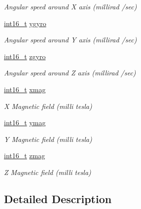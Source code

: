 \begin{DoxyCompactItemize}
\begin{DoxyCompactList}\small\item\em Angular speed around X axis (millirad /sec) \end{DoxyCompactList}\item 
\hyperlink{stdint_8h_aa343fa3b3d06292b959ffdd4c4703b06}{int16\-\_\-t} \hyperlink{struct____mavlink__scaled__imu__t_a357d16590de8334390c67ddd5d3139b3}{ygyro}
\begin{DoxyCompactList}\small\item\em Angular speed around Y axis (millirad /sec) \end{DoxyCompactList}\item 
\hyperlink{stdint_8h_aa343fa3b3d06292b959ffdd4c4703b06}{int16\-\_\-t} \hyperlink{struct____mavlink__scaled__imu__t_a907db6388e441e51dc12ca89fa6c557b}{zgyro}
\begin{DoxyCompactList}\small\item\em Angular speed around Z axis (millirad /sec) \end{DoxyCompactList}\item 
\hyperlink{stdint_8h_aa343fa3b3d06292b959ffdd4c4703b06}{int16\-\_\-t} \hyperlink{struct____mavlink__scaled__imu__t_a600200625259b8ddc5702b2116e9d619}{xmag}
\begin{DoxyCompactList}\small\item\em X Magnetic field (milli tesla) \end{DoxyCompactList}\item 
\hyperlink{stdint_8h_aa343fa3b3d06292b959ffdd4c4703b06}{int16\-\_\-t} \hyperlink{struct____mavlink__scaled__imu__t_a9a17a611fe6ec9e3f5a384cb1708e0e9}{ymag}
\begin{DoxyCompactList}\small\item\em Y Magnetic field (milli tesla) \end{DoxyCompactList}\item 
\hyperlink{stdint_8h_aa343fa3b3d06292b959ffdd4c4703b06}{int16\-\_\-t} \hyperlink{struct____mavlink__scaled__imu__t_a10577e1d6e32fc231527134352ea9587}{zmag}
\begin{DoxyCompactList}\small\item\em Z Magnetic field (milli tesla) \end{DoxyCompactList}\end{DoxyCompactItemize}


\subsection{Detailed Description}


